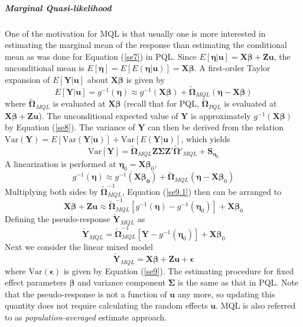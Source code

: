 \subparagraph*{Marginal Quasi-likelihood} 
One of the motivation for MQL is that usually one is more interested in estimating the marginal
mean of the response than estimating the conditional mean as was done for Equation (\ref{se7}) in
PQL. Since $E[\bm \eta|\bm u]= \bm {X\beta} + \bm {Zu}$, the unconditional mean is $E[\bm \eta] =
E[E(\bm \eta|\bm u)]= \bm {X\beta}$. A first-order Taylor expansion of $E[\bm Y|\bm u]$ about $\bm X
\bm\beta$ is given by 
\begin{equation}\label{se8}
	E[\bm Y|\bm u] = g^{-1}(\bm \eta) \approx g^{-1} (\bm{X\beta}) + \tilde{\bm \Omega}_{MQL} (\bm
	\eta - \bm X\bm \beta)
\end{equation}
where $\tilde{\bm \Omega}_{MQL}$ is evaluated at $\bm {X\beta}$ (recall that for PQL, $\tilde{\bm
	\Omega}_{PQL}$ is evaluated at $\bm {X\beta} + \bm {Zu}$). The unconditional expected value of 
$\bm
Y$ is approximately $g^{-1}(\bm {X\beta})$ by Equation (\ref{se8}). The variance of $\bm Y$ can then
be derived from the relation $\text{Var}(\bm Y)= E[\text{Var}(\bm Y|\bm u)] + \text{Var}[E(\bm Y|
\bm u)]$, which yields
\begin{equation}\label{se9}
	\text{Var}[\bm Y] = \tilde{\bm \Omega}_{MQL} \bm {Z\Sigma Z'}\tilde{\bm \Omega}'_{MQL} + \bm
	S_{\bm \eta_0}
\end{equation}
A linearization is performed at $\bm \eta_0= \bm X \bm \beta_0$, 
\begin{equation}\label{se9.1}
	g^{-1}(\bm \eta) \approx g^{-1} (\bm{X\beta_0}) + \tilde{\bm \Omega}_{MQL} (\bm \eta - \bm X\bm
	\beta_0)
\end{equation}
Multiplying both sides by $\tilde{\bm \Omega}_{MQL} ^{-1}$, Equation (\ref{se9.1}) then can be
arranged to 
\[\bm {X\beta} + \bm {Zu} \approx \tilde{\bm \Omega}_{MQL}^{-1}[g^{-1}(\bm\eta)- g^{-1}(\bm
\eta_0)]  + \bm{X}\bm \beta_0 \]
Defining the pseudo-response $\tilde{\bm Y}_{MQL}$ as
\begin{equation}\label{se10}
	\tilde{\bm Y}_{MQL} =  \tilde{\bm \Omega}_{MQL}^{-1}[\bm Y- g^{-1}(\bm \eta_0)]  + \bm{X}\bm
	\beta_0 
\end{equation}
Next we consider the linear mixed model 
\[ \tilde{\bm Y}_{MQL}  = \bm {X\beta}+ \bm {Zu}  + \bm \epsilon\] 
where $\text{Var}(\bm \epsilon) $ is given by Equation (\ref{se9}).  The estimating procedure for
fixed effect parameters $\bm \beta$ and variance component $\bm \Sigma$ is the same as that in PQL.
Note that the pseudo-response is not a function of $\bm u$ any more, so updating this quantity does
not require calculating the random effects $\bm u$. MQL is also referred to as
\textit{population-averaged} estimate approach.

